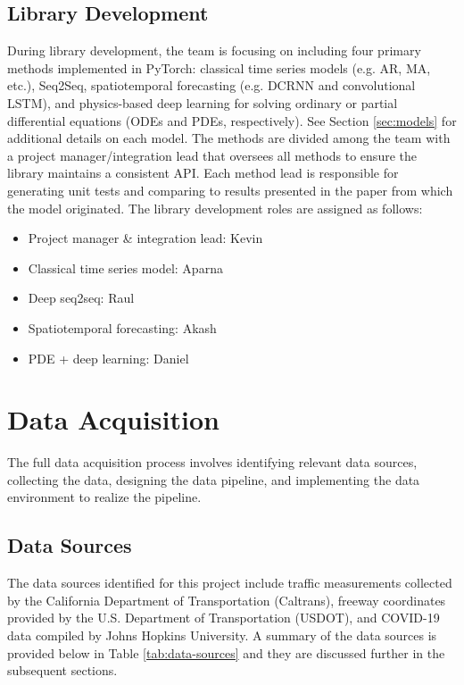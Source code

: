 \documentclass{article}
\begin{document}
\subsection{Library Development}

During library development, the team is focusing on including four primary methods implemented in PyTorch: classical time series models (e.g. AR, MA, etc.), Seq2Seq, spatiotemporal forecasting (e.g. DCRNN and convolutional LSTM), and physics-based deep learning for solving ordinary or partial differential equations (ODEs and PDEs, respectively). See Section \ref{sec:models} for additional details on each model. The methods are divided among the team with a project manager/integration lead that oversees all methods to ensure the library maintains a consistent API. Each method lead is responsible for generating unit tests and comparing to results presented in the paper from which the model originated. The library development roles are assigned as follows:

\begin{itemize}
    \item Project manager \& integration lead: Kevin
	\item Classical time series model: Aparna
	\item Deep seq2seq: Raul
	\item Spatiotemporal forecasting: Akash
	\item PDE + deep learning: Daniel
\end{itemize}

\section{Data Acquisition}

The full data acquisition process involves identifying relevant data sources, collecting the data, designing the data pipeline, and implementing the data environment to realize the pipeline.

\subsection{Data Sources}
\label{sec:data-sources}

The data sources identified for this project include traffic measurements collected by the California Department of Transportation (Caltrans), freeway coordinates provided by the U.S. Department of Transportation (USDOT), and COVID-19 data compiled by Johns Hopkins University. A summary of the data sources is provided below in Table \ref{tab:data-sources} and they are discussed further in the subsequent sections.
\end{document}
